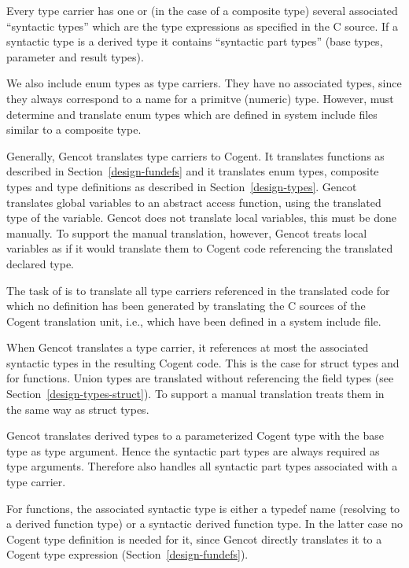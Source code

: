 Every type carrier has one or (in the case of a composite type) several associated ``syntactic types''
which are the type expressions as specified in the C source. If a syntactic type is a derived type it contains
``syntactic part types'' (base types, parameter and result types). 

We also include enum types as type carriers. They have no associated types, since they always correspond to a name 
for a primitve (numeric) type. However,  must determine and translate enum types which 
are defined in system include files similar to a composite type.

Generally, Gencot translates type carriers to Cogent. It translates functions as described in Section~\ref{design-fundefs}
and it translates enum types, composite types and type definitions as described in Section~\ref{design-types}.
Gencot translates global variables to an abstract access function, using the translated type of the variable.
Gencot does not translate local variables, this must be done manually. To support the manual translation, 
however, Gencot treats local variables as if it would translate them to Cogent code referencing the translated 
declared type.

The task of  is to translate all type carriers referenced in the translated code for which
no definition has been generated by translating the C sources of the Cogent translation unit, i.e., which have
been defined in a system include file.

When Gencot translates a type carrier, it references at most the associated syntactic types in the resulting Cogent code.
This is the case for struct types and for functions. Union types are translated without referencing the field types
(see Section~\ref{design-types-struct}). To support a manual translation  treats them in 
the same way as struct types.

Gencot translates derived types to a parameterized Cogent type with the base type as type argument. Hence the syntactic 
part types are always required as type arguments. Therefore  also handles all syntactic
part types associated with a type carrier.

For functions, the associated syntactic type is either a typedef name (resolving to a derived function type) 
or a syntactic derived function type. In the latter case no Cogent type definition is needed for it, since Gencot
directly translates it to a Cogent type expression (Section~\ref{design-fundefs}). 

